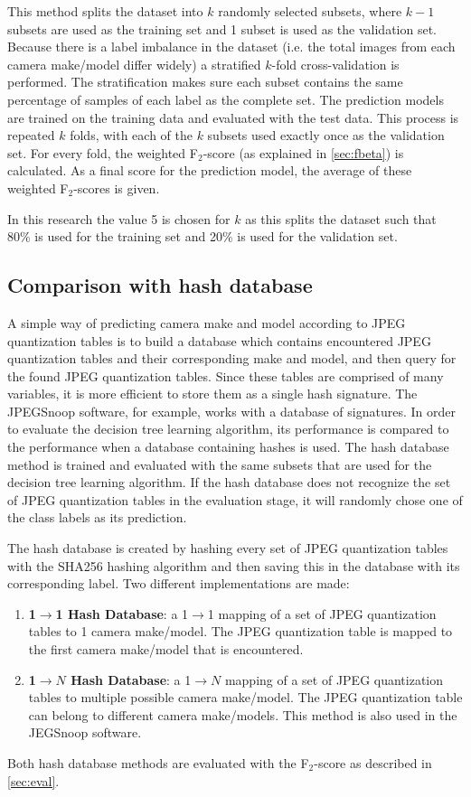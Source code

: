 This method splits the dataset into $k$ randomly selected subsets, where $k-1$ subsets are used as the training set and 1 subset is used as the validation set. Because there is a label imbalance in the dataset (i.e. the total images from each camera make/model differ widely) a stratified   $k$-fold cross-validation is performed. The stratification makes sure each subset contains the same percentage of samples of each label as the complete set. The prediction models are trained on the training data and evaluated with the test data. This process is repeated $k$ folds, with each of the $k$ subsets used exactly once as the validation set. For every fold, the weighted F$_2$-score (as explained in \autoref{sec:fbeta}) is calculated. As a final score for the prediction model, the average of these weighted F$_2$-scores is given.

In this research the value 5 is chosen for $k$ as this splits the dataset such that 80\% is used for the training set and 20\% is used for the validation set.

\subsection{Comparison with hash database}\label{sec:impl_hash}
A simple way of predicting camera make and model according to JPEG quantization tables is to build a database which contains encountered JPEG quantization tables and their corresponding make and model, and then query for the found JPEG quantization tables. Since these tables are comprised of many variables, it is more efficient to store them as a single hash signature. The JPEGSnoop software, for example, works with a database of signatures. In order to evaluate the decision tree learning algorithm, its performance is compared to the performance when a database containing hashes is used. The hash database method is trained and evaluated with the same subsets that are used for the decision tree learning algorithm. If the hash database does not recognize the set of JPEG quantization tables in the evaluation stage, it will randomly chose one of the class labels as its prediction. 

The hash database is created by hashing every set of JPEG quantization tables with the SHA256 hashing algorithm and then saving this in the database with its corresponding label. Two different implementations are made:
\begin{enumerate}
\item \textbf{1$\rightarrow$1 Hash Database}: a 1$\rightarrow$1 mapping of a set of JPEG quantization tables to 1 camera make/model. The JPEG quantization table is mapped to the first camera make/model that is encountered.
\item \textbf{1$\rightarrow N$ Hash Database}: a 1$\rightarrow N$ mapping of a set of JPEG quantization tables to multiple possible camera make/model. The JPEG quantization table can belong to different camera make/models. This method is also used in the JEGSnoop software. 
\end{enumerate}

Both hash database methods are evaluated with the F$_2$-score as described in \autoref{sec:eval}.